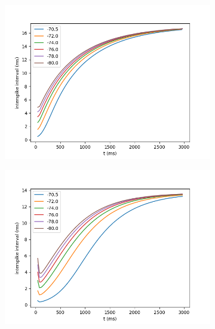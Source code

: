 \documentclass{article}
\begin{document}
\begin{figure}[h]
	\centering
	\begin{subfigure}[t]{0.30\linewidth}
		\centering
		\includegraphics[width = 1.0\linewidth, trim={20 10 20 20}, clip=true]{intervals_ts_10_rmgs_015e.png}
		\label{fig:ts10e}	
	\end{subfigure}%
	\hspace{0.03\linewidth}
	\begin{subfigure}[t]{0.30\linewidth}
		\centering
		\includegraphics[width = 1.0\linewidth, trim={20 10 20 20}, clip=true]{intervals_ts_20_rmgs_015e.png}
		\label{fig:ts20e}	
	\end{subfigure}%

\end{figure}
\end{document}
